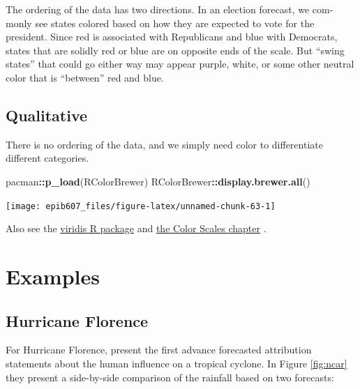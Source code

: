\documentclass[]{book}
\makeatletter
\newenvironment{Shaded}{\begin{snugshade}}{\end{snugshade}}
\newcommand{\KeywordTok}[1]{\textcolor[rgb]{0.13,0.29,0.53}{\textbf{#1}}}
\newcommand{\OperatorTok}[1]{\textcolor[rgb]{0.81,0.36,0.00}{\textbf{#1}}}
\newcommand{\NormalTok}[1]{#1}
\newenvironment{kframe}{%
\medskip{}
\setlength{\fboxsep}{.8em}
 \def\at@end@of@kframe{}%
 \ifinner\ifhmode%
  \def\at@end@of@kframe{\end{minipage}}%
  \begin{minipage}{\columnwidth}%
 \fi\fi%
 \def\FrameCommand##1{\hskip\@totalleftmargin \hskip-\fboxsep
 \colorbox{shadecolor}{##1}\hskip-\fboxsep
     \hskip-\linewidth \hskip-\@totalleftmargin \hskip\columnwidth}%
 \MakeFramed {\advance\hsize-\width
   \@totalleftmargin\z@ \linewidth\hsize
   \@setminipage}}%
 {\par\unskip\endMakeFramed%
 \at@end@of@kframe}
\renewenvironment{Shaded}{\begin{kframe}}{\end{kframe}}
\theoremstyle{definition}
\theoremstyle{definition}
\theoremstyle{definition}
\theoremstyle{remark}
\makeatother
\begin{document}
The ordering of the data has two directions. In an election forecast, we
com- monly see states colored based on how they are expected to vote for
the president. Since red is associated with Republicans and blue with
Democrats, states that are solidly red or blue are on opposite ends of
the scale. But ``swing states'' that could go either way may appear
purple, white, or some other neutral color that is ``between'' red and
blue.

\subsection{Qualitative}\label{qualitative}

There is no ordering of the data, and we simply need color to
differentiate different categories.

\begin{Shaded}
\begin{Highlighting}[]
\NormalTok{pacman}\OperatorTok{::}\KeywordTok{p_load}\NormalTok{(RColorBrewer)}
\NormalTok{RColorBrewer}\OperatorTok{::}\KeywordTok{display.brewer.all}\NormalTok{()}
\end{Highlighting}
\end{Shaded}

\begin{center}\texttt{[image: epib607\_files/figure-latex/unnamed-chunk-63-1]} \end{center}

Also see the
\href{https://cran.r-project.org/web/packages/viridis/vignettes/intro-to-viridis.html}{viridis
R package} and
\href{https://serialmentor.com/dataviz/color-basics.html}{the Color
Scales chapter} \citep{wilke}.

\section{Examples}\label{examples}

\subsection{Hurricane Florence}\label{hurricane-florence}

For Hurricane Florence, \citet{ncar} present the first advance
forecasted attribution statements about the human influence on a
tropical cyclone. In Figure \ref{fig:ncar} they present a side-by-side
comparison of the rainfall based on two forecasts:
\end{document}
